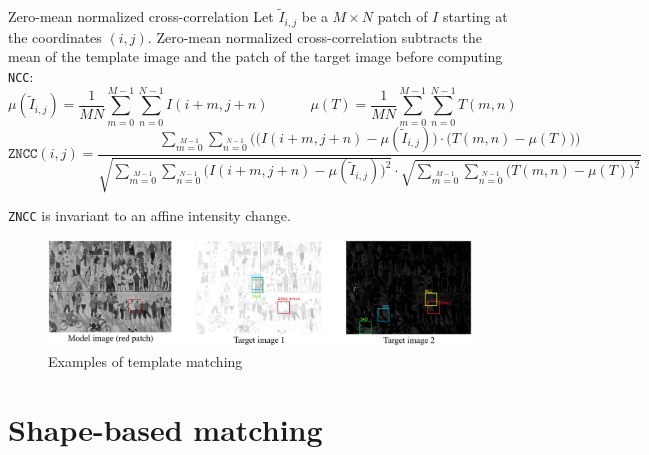 \begin{descriptionlist}
    \item[Zero-mean normalized cross-correlation] 
        Let $\tilde{I}_{i,j}$ be a $M \times N$ patch of $I$ starting at the coordinates $(i, j)$.
        Zero-mean normalized cross-correlation subtracts the mean of the template image and the patch of the target image
        before computing \texttt{NCC}:
        \[ \mu(\tilde{I}_{i,j}) = \frac{1}{MN} \sum_{m=0}^{M-1} \sum_{n=0}^{N-1} I(i+m, j+n) \hspace{3em} \mu(T) = \frac{1}{MN} \sum_{m=0}^{M-1} \sum_{n=0}^{N-1} T(m, n) \]
        \[ 
            \texttt{ZNCC}(i, j) = 
            \frac{ \sum\limits_{m=0}\limits^{M-1} \sum\limits_{n=0}\limits^{N-1} \Big( \big(I(i+m, j+n) - \mu(\tilde{I}_{i,j})\big) \cdot \big(T(m, n) - \mu(T)\big) \Big) }
                { \sqrt{\sum\limits_{m=0}\limits^{M-1} \sum\limits_{n=0}\limits^{N-1} \big(I(i+m, j+n) - \mu(\tilde{I}_{i,j})\big)^2} \cdot \sqrt{\sum\limits_{m=0}\limits^{M-1} \sum\limits_{n=0}\limits^{N-1} \big(T(m, n) - \mu(T)\big)^2} } 
        \]

        \begin{remark}
            \texttt{ZNCC} is invariant to an affine intensity change.
        \end{remark}
\end{descriptionlist}

\begin{figure}[H]
    \centering
    \includegraphics[width=0.95\linewidth]{./img/template_matching_example.png}
    \caption{Examples of template matching}
\end{figure}



\section{Shape-based matching}

